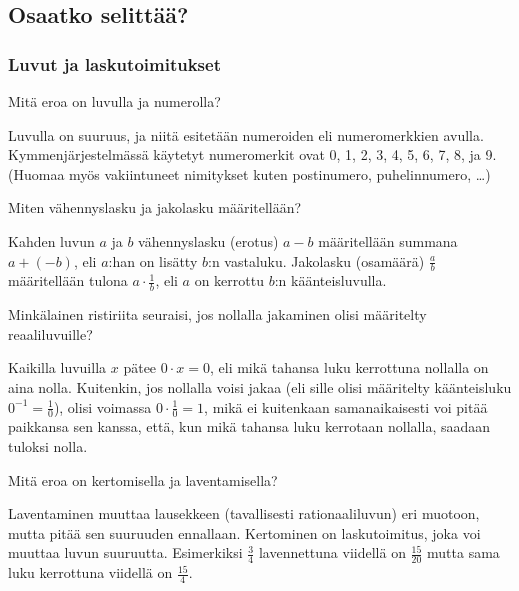 \subsection*{Osaatko selittää?}
\begin{multicols}{2}
\subsubsection*{Luvut ja laskutoimitukset}

\begin{tehtava}
Mitä eroa on luvulla ja numerolla?
\begin{vastaus}
Luvulla on suuruus, ja niitä esitetään numeroiden eli numeromerkkien avulla. Kymmenjärjestelmässä käytetyt numeromerkit ovat 0, 1, 2, 3, 4, 5, 6, 7, 8, ja 9. (Huomaa myös vakiintuneet nimitykset kuten postinumero, puhelinnumero, \ldots)
\end{vastaus}
\end{tehtava}

\begin{tehtava}
Miten vähennyslasku ja jakolasku määritellään?
\begin{vastaus}
Kahden luvun $a$ ja $b$ vähennyslasku (erotus) $a-b$ määritellään summana $a+(-b)$, eli $a$:han on lisätty $b$:n vastaluku. Jakolasku (osamäärä) $\frac{a}{b}$ määritellään tulona $a\cdot \frac1b$, eli $a$ on kerrottu $b$:n käänteisluvulla.
\end{vastaus}
\end{tehtava}

\begin{tehtava}
Minkälainen ristiriita seuraisi, jos nollalla jakaminen olisi määritelty reaaliluvuille?
\begin{vastaus}
Kaikilla luvuilla $x$ pätee $0 \cdot x = 0$, eli mikä tahansa luku kerrottuna nollalla on aina nolla. Kuitenkin, jos nollalla voisi jakaa (eli sille olisi määritelty käänteisluku $0^{-1}=\frac10$), olisi voimassa $0 \cdot\frac10 = 1$, mikä ei kuitenkaan samanaikaisesti voi pitää paikkansa sen kanssa, että, kun mikä tahansa luku kerrotaan nollalla, saadaan tuloksi nolla.
\end{vastaus}
\end{tehtava}

\begin{tehtava}
Mitä eroa on kertomisella ja laventamisella?
\begin{vastaus}
Laventaminen muuttaa lausekkeen (tavallisesti rationaaliluvun) eri muotoon, mutta pitää sen suuruuden ennallaan. Kertominen on laskutoimitus, joka voi muuttaa luvun suuruutta. Esimerkiksi $\frac34$ lavennettuna viidellä on $\frac{15}{20}$ mutta sama luku kerrottuna viidellä on $\frac{15}{4}$.
\end{vastaus}
\end{tehtava}


\end{multicols}
